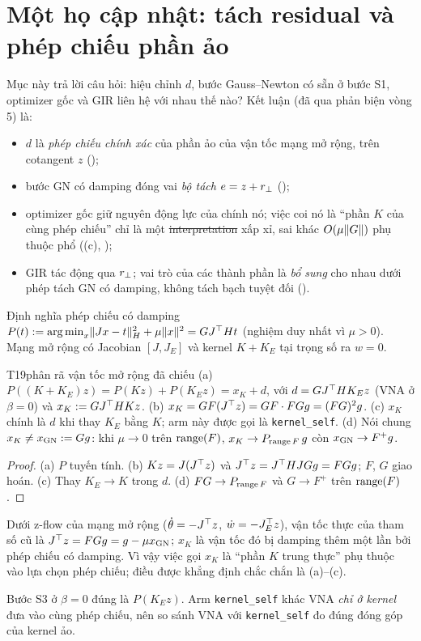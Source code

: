 \section{Một họ cập nhật: tách residual và phép chiếu phần ảo}\label{sec:unified}

Mục này trả lời câu hỏi: hiệu chỉnh $d$, bước Gauss--Newton có sẵn ở bước S1, optimizer gốc và GIR liên hệ với nhau thế nào? Kết luận (đã qua phản biện vòng 5) là:
\begin{itemize}
  \item $d$ là \emph{phép chiếu chính xác} của phần ảo của vận tốc mạng mở rộng, trên cotangent $z$ ();
  \item bước GN có damping đóng vai \emph{bộ tách} $e=z+r_{\perp}$ ();
  \item optimizer gốc giữ nguyên động lực của chính nó; việc coi nó là ``phần $K$ của cùng phép chiếu'' chỉ là một \st{interpretation} xấp xỉ, sai khác $O(\mu\lVert G\rVert)$ phụ thuộc phổ ((c), );
  \item GIR tác động qua $r_{\perp}$; vai trò của các thành phần là \emph{bổ sung} cho nhau dưới phép tách GN có damping, không tách bạch tuyệt đối ().
\end{itemize}

Định nghĩa phép chiếu có damping $P(t):=\operatorname*{arg\,min}_x\lVert Jx-t\rVert_H^2+\mu\lVert x\rVert^2=GJ^{\top} Ht$ (nghiệm duy nhất vì $\mu>0$). Mạng mở rộng có Jacobian $[J,J_E]$ và kernel $K+K_E$ tại trọng số ra $w=0$.

\begin{namedthm}{T19}{phân rã vận tốc mở rộng đã chiếu}
(a) $P((K+K_E)z)=P(Kz)+P(K_Ez)=x_K+d$, với $d=GJ^{\top} HK_Ez$ (VNA ở $\beta=0$) và $x_K:=GJ^{\top} HKz$.
(b) $x_K=GF(J^{\top} z)=GF\cdot FGg=(FG)^2g$.
(c) $x_K$ chính là $d$ khi thay $K_E$ bằng $K$; arm này được gọi là \texttt{kernel\_self}.
(d) Nói chung $x_K\ne x_{\mathrm{GN}}:=Gg$: khi $\mu\to0$ trên $\operatorname{range}(F)$, $x_K\to P_{\operatorname{range} F}\,g$ còn $x_{\mathrm{GN}}\to F^+g$.
\end{namedthm}
\begin{proof}
(a) $P$ tuyến tính. (b) $Kz=J(J^{\top} z)$ và $J^{\top} z=J^{\top} HJGg=FGg$; $F$, $G$ giao hoán. (c) Thay $K_E\to K$ trong $d$. (d) $FG\to P_{\operatorname{range} F}$ và $G\to F^+$ trên $\operatorname{range}(F)$.
\end{proof}
\begin{remark}
Dưới z-flow của mạng mở rộng ($\dot\theta=-J^{\top} z$, $\dot w=-J_E^{\top} z$), vận tốc thực của tham số cũ là $J^{\top} z=FGg=g-\mu x_{\mathrm{GN}}$; $x_K$ là vận tốc đó bị damping thêm một lần bởi phép chiếu có damping. Vì vậy việc gọi $x_K$ là ``phần $K$ trung thực'' phụ thuộc vào lựa chọn phép chiếu; điều được khẳng định chắc chắn là (a)--(c).
\end{remark}
\begin{hequa}
Bước S3 ở $\beta=0$ đúng là $P(K_Ez)$. Arm \texttt{kernel\_self} khác VNA \emph{chỉ ở kernel} đưa vào cùng phép chiếu, nên so sánh VNA với \texttt{kernel\_self} đo đúng đóng góp của kernel ảo.
\end{hequa}


